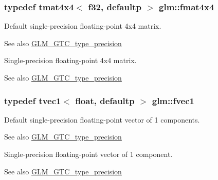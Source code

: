 \subsubsection[{fmat4x4}]{\setlength{\rightskip}{0pt plus 5cm}typedef tmat4x4$<$ f32, defaultp $>$ {\bf glm\+::fmat4x4}}\label{group__gtc__type__precision_ga16b508b75c7213ba6b24055ff3b7503d}
Default single-\/precision floating-\/point 4x4 matrix. \begin{DoxySeeAlso}{See also}
\hyperlink{group__gtc__type__precision}{G\+L\+M\+\_\+\+G\+T\+C\+\_\+type\+\_\+precision}
\end{DoxySeeAlso}
Single-\/precision floating-\/point 4x4 matrix. \begin{DoxySeeAlso}{See also}
\hyperlink{group__gtc__type__precision}{G\+L\+M\+\_\+\+G\+T\+C\+\_\+type\+\_\+precision} 
\end{DoxySeeAlso}
\hypertarget{group__gtc__type__precision_gaa732e5d06540922c44d3e35f32d6e948}{}
\subsubsection[{fvec1}]{\setlength{\rightskip}{0pt plus 5cm}typedef tvec1$<$ float, defaultp $>$ {\bf glm\+::fvec1}}\label{group__gtc__type__precision_gaa732e5d06540922c44d3e35f32d6e948}
Default single-\/precision floating-\/point vector of 1 components. \begin{DoxySeeAlso}{See also}
\hyperlink{group__gtc__type__precision}{G\+L\+M\+\_\+\+G\+T\+C\+\_\+type\+\_\+precision}
\end{DoxySeeAlso}
Single-\/precision floating-\/point vector of 1 component. \begin{DoxySeeAlso}{See also}
\hyperlink{group__gtc__type__precision}{G\+L\+M\+\_\+\+G\+T\+C\+\_\+type\+\_\+precision} 
\end{DoxySeeAlso}
\hypertarget{group__gtc__type__precision_ga83fb34639f810d0c9240cf7ff0180e20}{}
